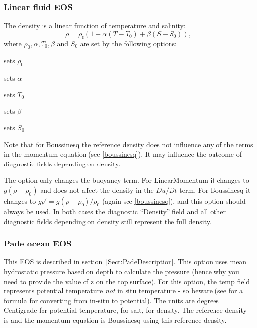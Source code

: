 \subsubsection{Linear fluid EOS}
The density is a linear function of temperature and salinity:
\begin{equation}
  \rho=\rho_0 \left(1-\alpha(T-T_0)+\beta (S-S_0)\right),
\end{equation}
where $\rho_0, \alpha, T_0, \beta$ and $S_0$ are set by the following 
options:
\begin{description}
\item {} sets $\rho_0$
\item {} sets $\alpha$
\item {} sets $T_0$
\item {} sets $\beta$
\item {} sets $S_0$
\end{description}
Note that for Boussinesq the reference density does not 
influence any of the terms in the 
momentum equation (see \eqref{boussinesq}). It may influence the outcome
of diagnostic fields depending on density.

The option  only changes 
the buoyancy term. For LinearMomentum it changes to 
$g(\rho-\rho_0)$ and does not affect the density in the $Du/Dt$ term. For
Boussinesq it changes to 
$g\rho'=g(\rho-\rho_0)/\rho_0$ (again see \eqref{boussinesq}), 
and this option should always be used.
In both cases the diagnostic
``Density'' field and all other diagnostic fields depending on density
still represent the full density.

\subsubsection{Pade ocean EOS}
This EOS is described in section~\ref{Sect:PadeDescription}.
This option uses mean hydrostatic pressure based on depth to calculate the
pressure (hence why you need to provide the value of z on the top surface).
For this option, the temp field represents potential temperature \emph{not} in
situ temperature - so beware (see \citet{mcdougall2003} for a formula for converting
from in-situ to potential). The units are degrees Centigrade for potential
temperature, \PSU{} for salt, \kgmm{} for density. The reference density is
\kgmm[1000] and the momentum equation is Boussinesq using this reference density.

